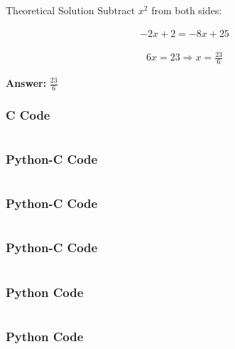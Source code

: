 \documentclass{beamer}
\begin{document}
\begin{frame}{Theoretical Solution}
Subtract $x^2$ from both sides:

\begin{align}
-2x + 2 = -8x + 25
\end{align}

\begin{align}
6x = 23 \Rightarrow x = \frac{23}{6}
\end{align}

\textbf{Answer:} $ \boxed{\frac{23}{6}} $
\end{frame}

\begin{frame}[fragile]
\frametitle{C Code}
   \begin{lstlisting}

   \end{lstlisting}
\end{frame}
\begin{frame}[fragile]
\frametitle{Python-C Code}
   \begin{lstlisting}

   \end{lstlisting}
\end{frame}

\begin{frame}[fragile]
\frametitle{Python-C Code}
   \begin{lstlisting}

   \end{lstlisting}
\end{frame}

\begin{frame}[fragile]
\frametitle{Python-C Code}
   \begin{lstlisting}

   \end{lstlisting}
\end{frame}

\begin{frame}[fragile]
\frametitle{Python Code}
   \begin{lstlisting}

\end{lstlisting}
\end{frame}

\begin{frame}[fragile]
\frametitle{Python Code}
   \begin{lstlisting}

\end{lstlisting}
\end{frame}
\end{document}
